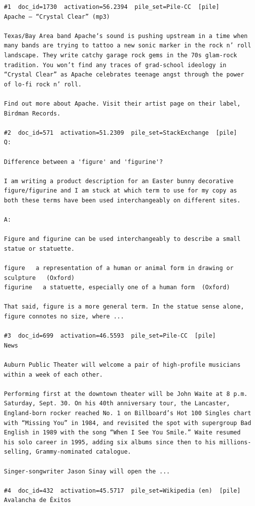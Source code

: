 \begin{verbatim}
#1  doc_id=1730  activation=56.2394  pile_set=Pile-CC  [pile]
Apache – “Crystal Clear” (mp3)

Texas/Bay Area band Apache‘s sound is pushing upstream in a time when many bands are trying to tattoo a new sonic marker in the rock n’ roll landscape. They write catchy garage rock gems in the 70s glam-rock tradition. You won’t find any traces of grad-school ideology in “Crystal Clear” as Apache celebrates teenage angst through the power of lo-fi rock n’ roll.

Find out more about Apache. Visit their artist page on their label, Birdman Records.

#2  doc_id=571  activation=51.2309  pile_set=StackExchange  [pile]
Q:

Difference between a 'figure' and 'figurine'?

I am writing a product description for an Easter bunny decorative figure/figurine and I am stuck at which term to use for my copy as both these terms have been used interchangeably on different sites. 

A:

Figure and figurine can be used interchangeably to describe a small statue or statuette.

figure   a representation of a human or animal form in drawing or sculpture   (Oxford)
figurine   a statuette, especially one of a human form  (Oxford)

That said, figure is a more general term. In the statue sense alone, figure connotes no size, where ...

#3  doc_id=699  activation=46.5593  pile_set=Pile-CC  [pile]
News

Auburn Public Theater will welcome a pair of high-profile musicians within a week of each other.

Performing first at the downtown theater will be John Waite at 8 p.m. Saturday, Sept. 30. On his 40th anniversary tour, the Lancaster, England-born rocker reached No. 1 on Billboard’s Hot 100 Singles chart with “Missing You” in 1984, and revisited the spot with supergroup Bad English in 1989 with the song “When I See You Smile.” Waite resumed his solo career in 1995, adding six albums since then to his millions-selling, Grammy-nominated catalogue.

Singer-songwriter Jason Sinay will open the ...

#4  doc_id=432  activation=45.5717  pile_set=Wikipedia (en)  [pile]
Avalancha de Éxitos


\end{verbatim}
